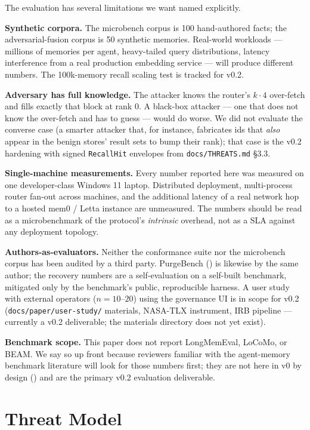 \documentclass[11pt,letterpaper,twocolumn]{article}
\begin{document}
The evaluation has several limitations we want named explicitly.

\textbf{Synthetic corpora.} The microbench corpus is 100 hand-authored facts; the adversarial-fusion corpus is 50 synthetic memories. Real-world workloads --- millions of memories per agent, heavy-tailed query distributions, latency interference from a real production embedding service --- will produce different numbers. The 100k-memory recall scaling test is tracked for v0.2.

\textbf{Adversary has full knowledge.} The  attacker knows the router's $k \cdot 4$ over-fetch and fills exactly that block at rank 0. A black-box attacker --- one that does not know the over-fetch and has to guess --- would do worse. We did not evaluate the converse case (a smarter attacker that, for instance, fabricates ids that \emph{also} appear in the benign stores' result sets to bump their rank); that case is the v0.2 hardening with signed \texttt{RecallHit} envelopes from \texttt{docs/THREATS.md} \S3.3.

\textbf{Single-machine measurements.} Every number reported here was measured on one developer-class Windows 11 laptop. Distributed deployment, multi-process router fan-out across machines, and the additional latency of a real network hop to a hosted mem0 / Letta instance are unmeasured. The numbers should be read as a microbenchmark of the protocol's \emph{intrinsic} overhead, not as a SLA against any deployment topology.

\textbf{Authors-as-evaluators.} Neither the conformance suite nor the microbench corpus has been audited by a third party. PurgeBench () is likewise by the same author; the recovery numbers are a self-evaluation on a self-built benchmark, mitigated only by the benchmark's public, reproducible harness. A user study with external operators ($n=10$--$20$) using the governance UI is in scope for v0.2 (\texttt{docs/paper/user-study/} materials, NASA-TLX instrument, IRB pipeline --- currently a v0.2 deliverable; the materials directory does not yet exist).

\textbf{Benchmark scope.} This paper does not report LongMemEval, LoCoMo, or BEAM. We say so up front because reviewers familiar with the agent-memory benchmark literature will look for those numbers first; they are not here in v0 by design () and are the primary v0.2 evaluation deliverable.

\section{Threat Model}
\label{sec:threats}
\end{document}
